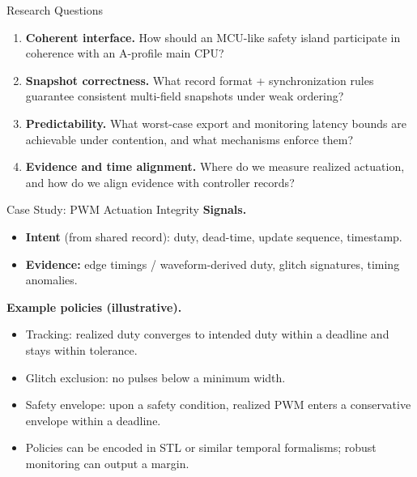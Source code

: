 \documentclass[aspectratio=169,12pt]{beamer}
\newcommand{\keyword}[1]{\textcolor{MidBlue}{\textbf{#1}}}
\newcommand{\SafetyIsland}{safety island\xspace}
\newcommand{\PrimaryCompute}{main CPU\xspace}
\newcommand{\STL}{STL\xspace}
\begin{document}
\begin{frame}{Research Questions}
\begin{enumerate}
\item[\keyword{RQ1}] \textbf{Coherent interface.} How should an MCU-like \SafetyIsland participate in coherence with an A-profile \PrimaryCompute?
\item[\keyword{RQ2}] \textbf{Snapshot correctness.} What record format + synchronization rules guarantee consistent multi-field snapshots under weak ordering?
\item[\keyword{RQ3}] \textbf{Predictability.} What worst-case export and monitoring latency bounds are achievable under contention, and what mechanisms enforce them?
\item[\keyword{RQ4}] \textbf{Evidence and time alignment.} Where do we measure realized actuation, and how do we align evidence with controller records?
\end{enumerate}
\end{frame}

\begin{frame}{Case Study: PWM Actuation Integrity}
\textbf{Signals.}
\begin{itemize}
\item \keyword{Intent} (from shared record): duty, dead-time, update sequence, timestamp.
\item \keyword{Evidence:} edge timings / waveform-derived duty, glitch signatures, timing anomalies.
\end{itemize}

\vspace{0.6em}
\textbf{Example policies (illustrative).}
\begin{itemize}
\item Tracking: realized duty converges to intended duty within a deadline and stays within tolerance.
\item Glitch exclusion: no pulses below a minimum width.
\item Safety envelope: upon a safety condition, realized PWM enters a conservative envelope within a deadline.
\item Policies can be encoded in \STL or similar temporal formalisms; robust monitoring can output a margin.
\end{itemize}
\end{frame}
\end{document}
